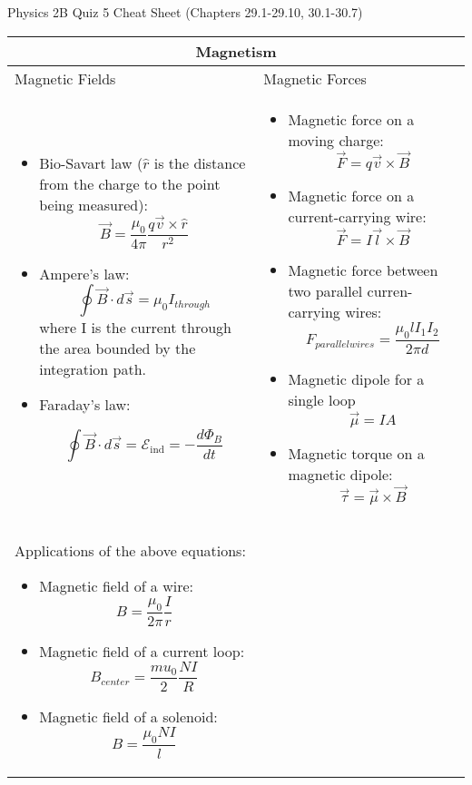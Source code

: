 \documentclass{article}
\begin{document}
\LARGE Physics 2B Quiz 5 Cheat Sheet (Chapters 29.1-29.10, 30.1-30.7)

\hrulefill
\normalsize

\begin{center}
	\begin{tabular}{|p{8cm}|p{8cm}|}
		\hline
		\multicolumn{2}{|c|}{Magnetism}                                                     \\
		\hline

		Magnetic Fields & Magnetic Forces                                                   \\

		\begin{itemize}
			\item Bio-Savart law ($ \hat{r}$ is the distance from the charge to the point being measured):
			      \[ \vec{B} = \frac{\mu_0}{4\pi} \frac{q\vec{v} \times \hat{r}}{r^2} \]
			\item Ampere's law:
			      \[ \oint \vec{B} \cdot d \vec{s} = \mu_0 I_{through} \]
			      where I is the current through the area bounded by the integration path.

			\item Faraday's law:

			      \[ \oint \vec B \cdot d \vec s = \mathcal{E}_\text{ind} = - \frac{d \Phi_B}{dt} \]
		\end{itemize}

		                &

		\begin{itemize}
			\item Magnetic force on a moving charge:
			      \[ \vec{F} = q\vec{v} \times \vec{B} \]
			\item Magnetic force on a current-carrying wire:
			      \[ \vec{F} = I\vec{l} \times \vec{B} \]
			\item Magnetic force between two parallel curren-carrying wires:
			      \[ F_{parallel wires} = \frac{\mu_0 l I_1 I_2}{2 \pi d}\]
			\item Magnetic dipole for a single loop \[\vec{\mu} = IA\]
			\item Magnetic torque on a magnetic dipole:
			      \[ \vec{\tau} = \vec{\mu} \times \vec{B}\]
		\end{itemize} \\
		\hline

		Applications of the above equations:
		\begin{itemize}
			\item Magnetic field of a wire:
			      \[B = \frac{\mu_0}{2\pi} \frac{I}{r}\]
			\item Magnetic field of a current loop:
			      \[B_{center} = \frac{mu_0}{2}\frac{NI}{R}\]
			\item Magnetic field of a solenoid:
			      \[B = \frac{\mu_0NI}{l}\]
		\end{itemize}


\end{tabular}
\end{center}
\end{document}
